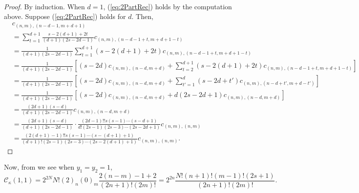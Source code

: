 \documentclass[10pt,oneside,american]{amsart}
\numberwithin{equation}{section}
\numberwithin{figure}{section}
\theoremstyle{definition}
\theoremstyle{remark}
\theoremstyle{plain}
\theoremstyle{definition}
\theoremstyle{plain}
\theoremstyle{plain}
\theoremstyle{plain}
\begin{document}
\begin{proof}
By induction. When $d=1$, (\ref{eq:2PartRec}) holds by the computation
above. Suppose (\ref{eq:2PartRec}) holds for $d$. Then, 
\begin{align*}
 & c_{\left(n,m\right),\left(n-d-1,m+d+1\right)}\\
 & =\sum_{t=1}^{d+1}\frac{s-2\left(d+1\right)+2t}{\left(d+1\right)\left(2s-2d-1\right)}c_{\left(n,m\right),\left(n-d-1+t,m+d+1-t\right)}\\
 & =\frac{1}{\left(d+1\right)\left(2s-2d-1\right)}\sum_{t=1}^{d+1}\left(s-2\left(d+1\right)+2t\right)c_{\left(n,m\right),\left(n-d-1+t,m+d+1-t\right)}\\
 & =\frac{1}{\left(d+1\right)\left(2s-2d-1\right)}\left[\left(s-2d\right)c_{\left(n,m\right),\left(n-d,m+d\right)}+\sum_{t=2}^{d+1}\left(s-2\left(d+1\right)+2t\right)c_{\left(n,m\right),\left(n-d-1+t,m+d+1-t\right)}\right]\\
 & =\frac{1}{\left(d+1\right)\left(2s-2d-1\right)}\left[\left(s-2d\right)c_{\left(n,m\right),\left(n-d,m+d\right)}+\sum_{t'=1}^{d}\left(s-2d+t'\right)c_{\left(n,m\right),\left(n-d+t',m+d-t'\right)}\right]\\
 & =\frac{1}{\left(d+1\right)\left(2s-2d-1\right)}\left[\left(s-2d\right)c_{\left(n,m\right),\left(n-d,m+d\right)}+d\left(2s-2d+1\right)c_{\left(n,m\right),\left(n-d,m+d\right)}\right]\\
 & =\frac{\left(2d+1\right)\left(s-d\right)}{\left(d+1\right)\left(2s-2d-1\right)}c_{\left(n,m\right),\left(n-d,m+d\right)}\\
 & =\frac{\left(2d+1\right)\left(s-d\right)}{\left(d+1\right)\left(2s-2d-1\right)}\cdot\frac{\left(2d-1\right)!!s\left(s-1\right)\cdots\left(s-d+1\right)}{d!\left(2s-1\right)\left(2s-3\right)\cdots\left(2s-2d+1\right)}c_{\left(n,m\right),\left(n,m\right)}\\
 & =\frac{\left(2\left(d+1\right)-1\right)!!s\left(s-1\right)\cdots\left(s-\left(d+1\right)+1\right)}{\left(d+1\right)!\left(2s-1\right)\left(2s-3\right)\cdots\left(2s-2\left(d+1\right)+1\right)}c_{\left(n,m\right),\left(n,m\right)}.
\end{align*}
\end{proof}
Now, from \cite[eq.~18, p.~237]{Muirhead} we see when $y_{1}=y_{2}=1$,
\[
\mathcal{C}_{\kappa}\left(1,1\right)=2^{2N}N!\left(2\right)_{n}\left(0\right)_{m}\frac{2\left(n-m\right)-1+2}{\left(2n+1\right)!\left(2m\right)!}=2^{2n}\frac{N!\left(n+1\right)!\left(m-1\right)!\left(2s+1\right)}{\left(2n+1\right)!\left(2m\right)!}.
\]
\end{document}
